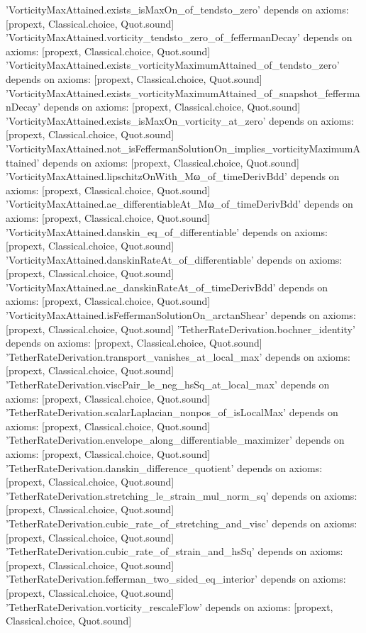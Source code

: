 \documentclass[11pt,a4paper]{article}
\theoremstyle{definition}
\theoremstyle{remark}
\begin{document}
\begin{leancode}
'VorticityMaxAttained.exists_isMaxOn_of_tendsto_zero' depends on axioms: [propext, Classical.choice, Quot.sound]
'VorticityMaxAttained.vorticity_tendsto_zero_of_feffermanDecay' depends on axioms: [propext, Classical.choice, Quot.sound]
'VorticityMaxAttained.exists_vorticityMaximumAttained_of_tendsto_zero' depends on axioms: [propext, Classical.choice, Quot.sound]
'VorticityMaxAttained.exists_vorticityMaximumAttained_of_snapshot_feffermanDecay' depends on axioms: [propext, Classical.choice, Quot.sound]
'VorticityMaxAttained.exists_isMaxOn_vorticity_at_zero' depends on axioms: [propext, Classical.choice, Quot.sound]
'VorticityMaxAttained.not_isFeffermanSolutionOn_implies_vorticityMaximumAttained' depends on axioms: [propext, Classical.choice, Quot.sound]
'VorticityMaxAttained.lipschitzOnWith_Mω_of_timeDerivBdd' depends on axioms: [propext, Classical.choice, Quot.sound]
'VorticityMaxAttained.ae_differentiableAt_Mω_of_timeDerivBdd' depends on axioms: [propext, Classical.choice, Quot.sound]
'VorticityMaxAttained.danskin_eq_of_differentiable' depends on axioms: [propext, Classical.choice, Quot.sound]
'VorticityMaxAttained.danskinRateAt_of_differentiable' depends on axioms: [propext, Classical.choice, Quot.sound]
'VorticityMaxAttained.ae_danskinRateAt_of_timeDerivBdd' depends on axioms: [propext, Classical.choice, Quot.sound]
'VorticityMaxAttained.isFeffermanSolutionOn_arctanShear' depends on axioms: [propext, Classical.choice, Quot.sound]
'TetherRateDerivation.bochner_identity' depends on axioms: [propext, Classical.choice, Quot.sound]
'TetherRateDerivation.transport_vanishes_at_local_max' depends on axioms: [propext, Classical.choice, Quot.sound]
'TetherRateDerivation.viscPair_le_neg_hsSq_at_local_max' depends on axioms: [propext, Classical.choice, Quot.sound]
'TetherRateDerivation.scalarLaplacian_nonpos_of_isLocalMax' depends on axioms: [propext, Classical.choice, Quot.sound]
'TetherRateDerivation.envelope_along_differentiable_maximizer' depends on axioms: [propext, Classical.choice, Quot.sound]
'TetherRateDerivation.danskin_difference_quotient' depends on axioms: [propext, Classical.choice, Quot.sound]
'TetherRateDerivation.stretching_le_strain_mul_norm_sq' depends on axioms: [propext, Classical.choice, Quot.sound]
'TetherRateDerivation.cubic_rate_of_stretching_and_visc' depends on axioms: [propext, Classical.choice, Quot.sound]
'TetherRateDerivation.cubic_rate_of_strain_and_hsSq' depends on axioms: [propext, Classical.choice, Quot.sound]
'TetherRateDerivation.fefferman_two_sided_eq_interior' depends on axioms: [propext, Classical.choice, Quot.sound]
'TetherRateDerivation.vorticity_rescaleFlow' depends on axioms: [propext, Classical.choice, Quot.sound]

\end{leancode}
\end{document}
